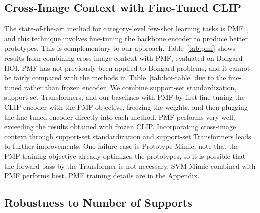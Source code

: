 \subsection{Cross-Image Context with Fine-Tuned CLIP}

The state-of-the-art method for category-level few-shot learning tasks is PMF~\cite{hu2022pushing}, and this technique involves fine-tuning the backbone encoder to produce better prototypes. This is complementary to our approach. Table~\ref{tab:pmf} shows results from combining cross-image context with PMF, evaluated on Bongard-HOI.
PMF has not previously been applied to Bongard problems, and it cannot be fairly compared with the methods in Table~\ref{tab:hoi-table} due to the fine-tuned rather than frozen encoder. We combine support-set standardization, support-set Transformers, and our baselines with PMF by first fine-tuning the CLIP encoder with the PMF objective, freezing the weights, and then plugging the fine-tuned encoder directly into each method. 
PMF performs very well, exceeding the 
 results obtained with frozen CLIP. 
Incorporating cross-image context through support-set standardization and support-set Transformers leads to further improvements.
One failure case is Prototype-Mimic; note that
the PMF training objective already optimizes the prototypes, so it is possible that the forward pass by the Transformer is not necessary. 
SVM-Mimic combined with PMF performs best. 
PMF training details are in the Appendix. 

\subsection{Robustness to Number of Supports}

